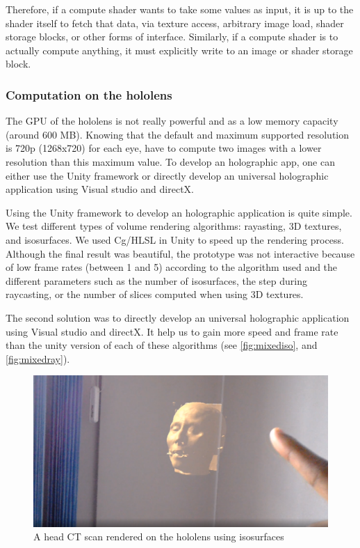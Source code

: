 Therefore, if a compute shader wants to take some values as input, it is up to the shader itself to fetch that data, via texture access, arbitrary image load, shader storage blocks, or other forms of interface. Similarly, if a compute shader is to actually compute anything, it must explicitly write to an image or shader storage block.

\subsubsection{Computation on the hololens}

The GPU of the hololens is not really powerful and as a low memory capacity (around 600 MB).  Knowing that the default and maximum supported resolution is 720p (1268x720) for each eye, have to compute two images with a lower resolution than this maximum value.  To develop an holographic app, one can either use the Unity framework or directly develop an universal holographic application using Visual studio and directX.


Using the Unity framework to develop an holographic application is quite simple. We test different types of volume rendering algorithms: rayasting, 3D textures, and isosurfaces.
We used Cg/HLSL in Unity to speed up the rendering process. Although the final result was beautiful, the prototype was not interactive because of low frame rates (between 1 and 5) according to the algorithm used and the different parameters such as the number of isosurfaces, the step during raycasting, or the number of slices computed when using 3D textures.


The second solution was to directly develop an universal holographic application using Visual studio and directX. It help us to gain more speed and frame rate than the unity version of each of these algorithms (see \autoref{fig:mixediso}, and \autoref{fig:mixedray}). 

\begin{figure}
\centering
\includegraphics [width=\textwidth]{Figures/mixediso}
\caption{A head CT scan rendered on the hololens using isosurfaces }
\label{fig:mixediso}
\end{figure}


